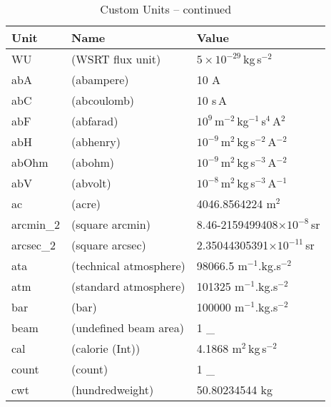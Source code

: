 \begin{table}
\begin{center}
\begin{tabular}{lll}
\end{tabular}
\end{center}
\end{table}




\begin{table}
\addtocounter{table}{-1}
\caption{Custom Units -- continued}

\begin{center}
\begin{tabular}{lll}
Unit & Name & Value \\
\hline
      WU         & (WSRT flux unit)              & $5\times 10^{-29}$\,kg\,s$^{-2}$\\
      abA        & (abampere)                    & 10 A\\
      abC        & (abcoulomb)                   & 10 s\,A\\
      abF        & (abfarad)                     & $10^{9}$\,m$^{-2}$\,kg$^{-1}$\,s$^{4}$\,A$^{2}$\\
      abH        & (abhenry)                     & $10^{-9}$\,m$^{2}$\,kg\,s$^{-2}$\,A$^{-2}$\\
      abOhm      & (abohm)                       & $10^{-9}$\,m$^{2}$\,kg\,s$^{-3}$\,A$^{-2}$\\
      abV        & (abvolt)                      & $10^{-8}$\,m$^{2}$\,kg\,s$^{-3}$\,A$^{-1}$\\
      ac         & (acre)                        & 4046.8564224 m$^{2}$\\
      arcmin\_2   & (square arcmin)               & 8.46-2159499408$\times10^{-8}$\,sr\\
      arcsec\_2   & (square arcsec)               & 2.35044305391$\times10^{-11}$\,sr\\
      ata        & (technical atmosphere)        & 98066.5 m$^{-1}$.kg.s$^{-2}$\\
      atm        & (standard atmosphere)         & 101325 m$^{-1}$.kg.s$^{-2}$\\
      bar        & (bar)                         & 100000 m$^{-1}$.kg.s$^{-2}$\\
      beam       & (undefined beam area)         & 1 \_\\
      cal        & (calorie (Int))               & 4.1868 m$^{2}$\,kg\,s$^{-2}$\\
      count      & (count)                       & 1 \_\\
      cwt        & (hundredweight)               & 50.80234544 kg\\

\end{tabular}
\end{center}
\end{table}
